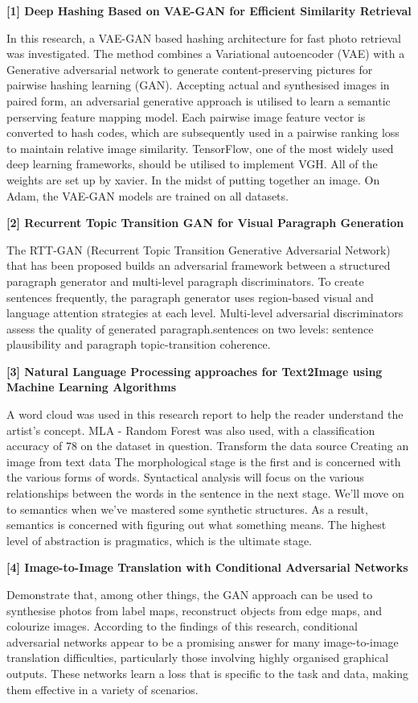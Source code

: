 
 \textbf  {[1] Deep Hashing Based on VAE-GAN for Efficient Similarity Retrieval}

In this research, a VAE-GAN based hashing architecture for fast photo retrieval was investigated. The method combines a Variational autoencoder (VAE) with a Generative adversarial network to generate content-preserving pictures for pairwise hashing learning (GAN). Accepting actual and synthesised images in paired form, an adversarial generative approach is utilised to learn a semantic perserving feature mapping model.
Each pairwise image feature vector is converted to hash codes, which are subsequently used in a pairwise ranking loss to maintain relative image similarity. TensorFlow, one of the most widely used deep learning frameworks, should be utilised to implement VGH. All of the weights are set up by xavier. In the midst of putting together an image. On Adam, the VAE-GAN models are trained on all datasets.

 \textbf { [2] Recurrent Topic Transition GAN for Visual Paragraph Generation}
 
The RTT-GAN (Recurrent Topic Transition Generative Adversarial Network) that has been proposed builds an adversarial framework between a structured paragraph generator and multi-level paragraph discriminators.
To create sentences frequently, the paragraph generator uses region-based visual and language attention strategies at each level. Multi-level adversarial discriminators assess the quality of generated paragraph.sentences on two levels: sentence plausibility and paragraph topic-transition coherence.


 \textbf {[3] Natural Language Processing approaches for Text2Image using Machine Learning Algorithms}

A word cloud was used in this research report to help the reader understand the artist's concept. MLA - Random Forest was also used, with a classification accuracy of 78 on the dataset in question. Transform the data source Creating an image from text data The morphological stage is the first and is concerned with the various forms of words. Syntactical analysis will focus on the various relationships between the words in the sentence in the next stage. We'll move on to semantics when we've mastered some synthetic structures. As a result, semantics is concerned with figuring out what something means. The highest level of abstraction is pragmatics, which is the ultimate stage.




 \textbf {[4] Image-to-Image Translation with Conditional Adversarial Networks}

\par Demonstrate that, among other things, the GAN approach can be used to synthesise photos from label maps, reconstruct objects from edge maps, and colourize images. According to the findings of this research, conditional adversarial networks appear to be a promising answer for many image-to-image translation difficulties, particularly those involving highly organised graphical outputs. These networks learn a loss that is specific to the task and data, making them effective in a variety of scenarios.

